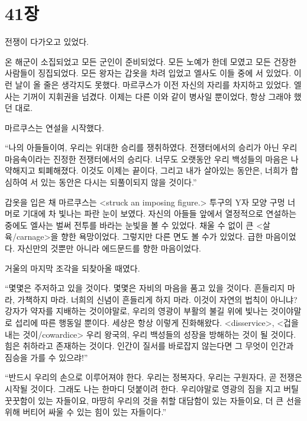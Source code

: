 

\chapter[41장  ~~][41장\hspace*{.5em}~~]{41장 \ ~~}



전쟁이 다가오고 있었다.

온 해군이 소집되었고 모든 군인이 준비되었다. 모든 노예가 한데 모였고 모든 건장한 사람들이 징집되었다. 모든 왕자는 갑옷을 차려 입었고 엘사도 이들 중에 서 있었다. 이런 날이 올 줄은 생각지도 못했다. 마르쿠스가 이전 자신의 자리를 차지하고 있었다. 엘사는 기꺼이 지휘권을 넘겼다. 이제는 다른 이와 같이 병사일 뿐이었다, 항상 그래야 했던 대로.

마르쿠스는 연설을 시작했다.

``나의 아들들이여, 우리는 위대한 승리를 쟁취하였다. 전쟁터에서의 승리가 아닌 우리 마음속이라는 진정한 전쟁터에서의 승리다. 너무도 오랫동안 우리 백성들의 마음은 나약해지고 퇴폐해졌다. 이것도 이제는 끝이다, 그리고 내가 살아있는 동안은, 너희가 합심하여 서 있는 동안은 다시는 되풀이되지 않을 것이다.''

갑옷을 입은 채 마르쿠스는 <struck an imposing figure.> 투구의 Y자 모양 구멍 너머로 기대에 차 빛나는 파란 눈이 보였다. 자신의 아들들 앞에서 열정적으로 연설하는 중에도 엘사는 벌써 전투를 바라는 눈빛을 볼 수 있었다. 채울 수 없이 큰 <살육/carnage>을 향한 욕망이었다. 그렇지만 다른 면도 볼 수가 있었다. 급한 마음이었다. 자신만의 것뿐만 아니라 에드문드를 향한 마음이었다.

거울의 마지막 조각을 되찾아올 때였다.

``몇몇은 주저하고 있을 것이다. 몇몇은 자비의 마음을 품고 있을 것이다. 흔들리지 마라, 가책하지 마라. 너희의 신념이 흔들리게 하지 마라. 이것이 자연의 법칙이 아니냐? 강자가 약자를 지배하는 것이야말로, 우리의 영광이 부활의 불길 위에 빛나는 것이야말로 섭리에 따른 행동일 뿐이다. 세상은 항상 이렇게 진화해왔다. <disservice>, <겁을 내는 것이/cowardice> 우리 왕국의, 우리 백성들의 성장을 방해하는 것이 될 것이다. 힘은 취하라고 존재하는 것이다. 인간이 질서를 바로잡지 않는다면 그 무엇이 인간과 짐승을 가를 수 있으랴!''

``반드시 우리의 손으로 이루어져야 한다. 우리는 정복자다, 우리는 구원자다, 곧 전쟁은 시작될 것이다. 그래도 나는 한마디 덧붙이려 한다. 우리야말로 영광의 짐을 지고 버틸 꿋꿋함이 있는 자들이요, 마땅히 우리의 것을 취할 대담함이 있는 자들이요, 더 큰 선을 위해 버티어 싸울 수 있는 힘이 있는 자들이다.''

